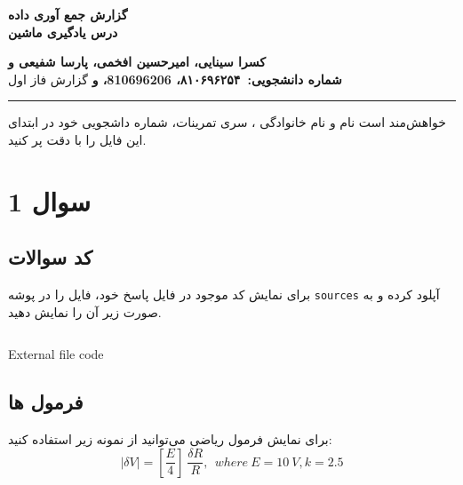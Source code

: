 
\def \Subject {گزارش جمع آوری داده }
\def \Course {درس یادگیری ماشین}
\def \Author {کسرا سینایی، امیرحسین افخمی، پارسا شفیعی و }
\def \Report {گزارش فاز اول}
\def \StudentNumber {۸۱۰۶۹۶۲۵۴، 810696206، و }

\begin{center}
\vspace{.4cm}
{\bf {\huge \Subject}}\\
{\bf \Large \Course}
\vspace{.2cm}
\end{center}
{\bf \Author }  \\
{\bf شماره دانشجویی:\ \StudentNumber}
\hspace{\fill} 
{\Large \Report} \\
\hrule
\vspace{0.8cm}

\clearpage

\par
 خواهش‌مند است نام و نام خانوادگی ، سری تمرینات، شماره داشجویی خود در ابتدای این فایل را با دقت پر کنید.

\section{سوال 1}
\subsection{کد سوالات}

 برای نمایش کد موجود در فایل پاسخ خود،
 فایل را در پوشه 
 \texttt{sources}
 آپلود کرده و به صورت زیر آن را نمایش دهید. 
 
\begin{latin}
\begin{listing}[ht]
    \inputminted{octave}{sources/partition.py}
    \caption{External file code}
    \label{listing:}
\end{listing}
\end{latin}

\subsection{فرمول ها}
\par
برای نمایش فرمول ریاضی می‌توانید از نمونه زیر استفاده کنید:
		\begin{equation}
		|\delta V |=\left[ \frac{E}{4}\right] \ \frac{\delta R}{R}, \ \ where\ E=10\ V, k=2.5
		\end{equation}
\clearpage


